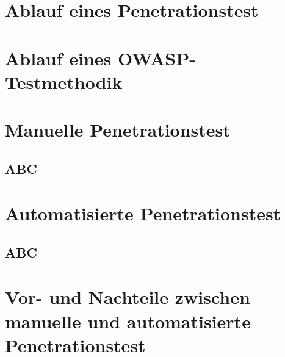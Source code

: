 \section{Ablauf eines Penetrationstest}

\section{Ablauf eines OWASP-Testmethodik}

\section{Manuelle Penetrationstest}

\subsection{ABC}

\section{Automatisierte Penetrationstest}

\subsection{ABC}

\section{Vor- und Nachteile zwischen manuelle und automatisierte Penetrationstest}
